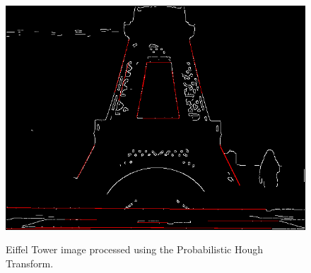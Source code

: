 \begin{figure}[ht!]
\begin{center}
\includegraphics[height=0.4\textwidth]{fig/eiffel_phough}\\
\caption{Eiffel Tower image processed using the Probabilistic Hough Transform.}
\label{fig_eiffel_phough}
\end{center}
\end{figure}
